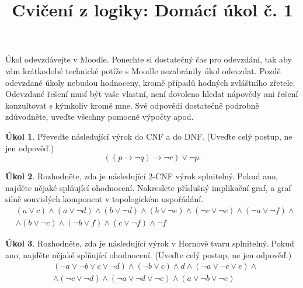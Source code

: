 \documentclass[a4paper]{amsart}
\title{\sc Cvičení z logiky: Domácí úkol č. 1}
\theoremstyle{definition}
\newtheorem{task}{Úkol}
\begin{document}
\maketitle

\thispagestyle{empty}

Úkol odevzdávejte v Moodle. Ponechte si dostatečný čas pro odevzdání, tak aby vám krátkodobé technické potíže s Moodle nezabránily úkol odevzdat. Pozdě odevzdané úkoly nebudou hodnoceny, kromě případů hodných zvláštního zřetele. Odevzdané řešení musí být vaše vlastní, není dovoleno hledat nápovědy ani řešení konzultovat s kýmkoliv kromě mne. Své odpovědi dostatečně podrobně zdůvodněte, uveďte všechny pomocné výpočty apod.


\begin{task}
Převeďte následující výrok do CNF a do DNF. (Uveďte celý postup, ne jen odpověď.)
$$
((p\to \neg q) \to \neg r) \vee \neg p.
$$
\end{task}

\begin{task}
Rozhodněte, zda je následující 2-CNF výrok splnitelný. Pokud ano, najděte nějaké splňující ohodnocení. Nakreslete příslušný implikační graf, a graf silně souvislých komponent v topologickém uspořádání.
\begin{align*}
&(a \vee  c) \wedge  (a \vee  \neg d) \wedge  (b \vee  \neg d) 
\wedge  (b \vee  \neg e) \wedge  (\neg c \vee  \neg e) 
\wedge  (\neg a \vee  \neg f)
\wedge \\ &\wedge (b\vee\neg c)\wedge
(\neg b \vee  f) \wedge  (c \vee  \neg f) \wedge \neg f
\end{align*}
\end{task}

\begin{task}
Rozhodněte, zda je následující výrok v Hornově tvaru splnitelný. Pokud ano, najděte nějaké splňující ohodnocení. (Uveďte celý postup, ne jen odpověď.)
\begin{align*}
&(\neg a \vee \neg b \vee c \vee \neg d)\wedge(\neg b \vee c)\wedge d \wedge (\neg a \vee \neg c \vee e)\wedge \\
&\wedge(\neg c \vee \neg d)\wedge(\neg a \vee \neg d \vee \neg e)\wedge(a\vee \neg b \vee\neg e)
\end{align*}
\end{task}
\end{document}
